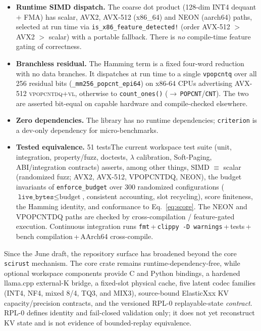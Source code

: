 \documentclass[11pt]{article}
\newcommand{\added}[1]{\textcolor{revisionblue}{#1}}
\newcommand{\deleted}[1]{\textcolor{revisionred}{#1}}
\newenvironment{addedblock}{\begingroup\color{revisionblue}}{\endgroup}
\theoremstyle{plain}
\theoremstyle{definition}
\begin{document}
\begin{itemize}[leftmargin=1.4em,itemsep=2pt]
  \item \textbf{Runtime SIMD dispatch.} The coarse dot product (128-dim
    INT4 dequant $+$ FMA) has scalar, AVX2, AVX-512 (x86\_64) and NEON
    (aarch64) paths, selected at run time via
    \texttt{is\_x86\_feature\_detected!} (order AVX-512 $>$ AVX2 $>$
    scalar) with a portable fallback. There is \emph{no} compile-time
    feature gating of correctness.
  \item \textbf{Branchless residual.} The Hamming term is a fixed
    four-word reduction with no data branches. It dispatches at run time to
    a single \texttt{vpopcntq} over all 256 residual bits
    (\texttt{\_mm256\_\allowbreak popcnt\_\allowbreak epi64}) on x86-64 CPUs advertising AVX-512
    \textsc{vpopcntdq}+\textsc{vl}, otherwise to \texttt{count\_ones()}
    ($\to$\,\texttt{POPCNT}/\texttt{CNT}). The two are asserted bit-equal on
    capable hardware and compile-checked elsewhere.
  \item \textbf{Zero dependencies.} The library has no runtime
    dependencies; \texttt{criterion} is a dev-only dependency for
    micro-benchmarks.
  \item \textbf{Tested equivalence.} \deleted{51 tests}\added{The current
    workspace test suite} (unit, integration, property/fuzz, doctests,
    $\lambda$ calibration, Soft-Paging, ABI/integration contracts) asserts,
    among other things, SIMD $\equiv$ scalar (randomized fuzz; AVX2,
    AVX-512, VPOPCNTDQ, NEON), the budget invariants of
    \texttt{enforce\_budget} over 300 randomized configurations
    ($\texttt{live\_bytes}\le\text{budget}$, consistent accounting, slot
    recycling), score finiteness, the Hamming identity, and conformance to
    Eq.~\eqref{eq:score}. The NEON and VPOPCNTDQ paths are checked by
    cross-compilation / feature-gated execution. Continuous integration runs
    \texttt{fmt}\,+\,\texttt{clippy -D warnings}\,+\,tests\,+\,bench
    compilation\,+\,AArch64 cross-compile.
\end{itemize}

\begin{addedblock}
Since the June draft, the repository surface has broadened beyond the core
\texttt{scirust} mechanism. The core crate remains runtime-dependency-free, while
optional workspace components provide C and Python bindings, a hardened
llama.cpp external-K bridge, a fixed-slot physical cache, five latent codec
families (INT4, NF4, mixed 8/4, TQ3, and MIX3), source-bound ElasticXxx KV
capacity/precision contracts, and the versioned RPL-0 replayable-state
\emph{contract}. RPL-0 defines identity and fail-closed validation only; it does
not yet reconstruct KV state and is not evidence of bounded-replay equivalence.
\end{addedblock}
\end{document}
